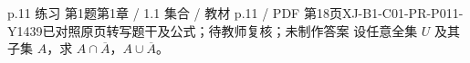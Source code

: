 \par\noindent\begin{minipage}{\linewidth}
\begin{bankitem}{p.11 练习 第1题}{第1章 / 1.1 集合 / 教材 p.11 / PDF 第18页}{XJ-B1-C01-PR-P011-Y1439}{已对照原页转写题干及公式；待教师复核；未制作答案}
设任意全集 $U$ 及其子集 $A$，求 $A\cap\overline A$，$A\cup\overline A$。
\end{bankitem}
\end{minipage}\par\medskip
